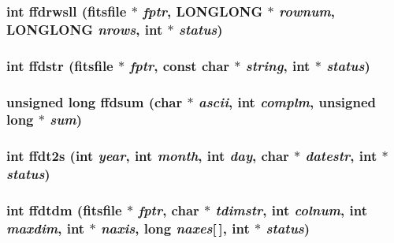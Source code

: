\subsubsection{\setlength{\rightskip}{0pt plus 5cm}int ffdrwsll (\bf{fitsfile} $\ast$ {\em fptr}, \bf{LONGLONG} $\ast$ {\em rownum}, \bf{LONGLONG} {\em nrows}, int $\ast$ {\em status})}\label{fitsio__64_8h_d372e6246c6c053a226a374967abb0c2}


\subsubsection{\setlength{\rightskip}{0pt plus 5cm}int ffdstr (\bf{fitsfile} $\ast$ {\em fptr}, const char $\ast$ {\em string}, int $\ast$ {\em status})}\label{fitsio__64_8h_0755a60e404afe7a7a2b50bea64a1b81}


\subsubsection{\setlength{\rightskip}{0pt plus 5cm}unsigned long ffdsum (char $\ast$ {\em ascii}, int {\em complm}, unsigned long $\ast$ {\em sum})}\label{fitsio__64_8h_92ef99105023242d9d89231c60960911}


\subsubsection{\setlength{\rightskip}{0pt plus 5cm}int ffdt2s (int {\em year}, int {\em month}, int {\em day}, char $\ast$ {\em datestr}, int $\ast$ {\em status})}\label{fitsio__64_8h_5d40e5b1da91bf71da1d25d207af045b}


\subsubsection{\setlength{\rightskip}{0pt plus 5cm}int ffdtdm (\bf{fitsfile} $\ast$ {\em fptr}, char $\ast$ {\em tdimstr}, int {\em colnum}, int {\em maxdim}, int $\ast$ {\em naxis}, long {\em naxes}[$\,$], int $\ast$ {\em status})}\label{fitsio__64_8h_cdc35cf0e93c93afd457df39fba48f2f}


